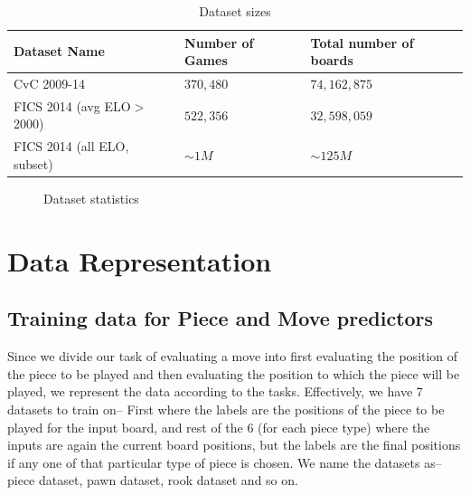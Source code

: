 \begin{table}[H]
\centering
\begin{tabular}{@{}lll@{}}
\toprule
Dataset Name & Number of Games 	& Total number of boards  \\
\midrule
CvC 2009-14  & $370,480$	& $74,162,875$             \\ 
FICS 2014 (avg ELO$>$2000)    & $522,356$    	& $32,598,059$      \\
FICS 2014 (all ELO, subset) & $\sim 1M$ & $\sim 125M$\\
\bottomrule
\end{tabular}
\caption{Dataset sizes}
\end{table}

\begin{figure}
  \hspace{0.5in}
  \scalebox{.7}{}
  \caption{Dataset statistics}
  \label{figure:datasets}
\end{figure}

\section{Data Representation}
\label{section:datarep}
\subsection{Training data for Piece and Move predictors}
Since we divide our task of evaluating a move into first evaluating the 
position 
of the piece to be played and then evaluating the position to which the piece 
will be played, we represent the data according to the tasks. Effectively, we 
have 7 datasets to train on-- First where the labels are the positions of the 
piece to be played for the input board, and rest of the 6 (for each piece type) 
where the inputs are again the current board positions, but the labels are the 
final positions if any one of that particular type of piece is chosen. We name 
the datasets as-- piece dataset, pawn dataset, rook dataset and so on. 

